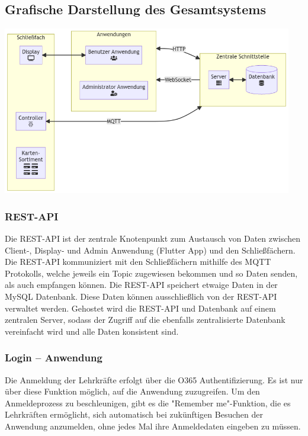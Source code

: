 \subsection{Grafische Darstellung des Gesamtsystems}
\begin{center}
\includegraphics[width=0.95\textwidth]{MJ/assets/complete-system.png}
\end{center}

\subsubsection{REST-API}
Die REST-API ist der zentrale Knotenpunkt zum Austausch von Daten zwischen Client-, Display- und Admin Anwendung (Flutter App) und den Schließfächern. Die REST-API kommuniziert mit den Schließfächern mithilfe des MQTT Protokolls, welche jeweils ein Topic zugewiesen bekommen und so Daten senden, als auch empfangen können. Die REST-API speichert etwaige Daten in der MySQL Datenbank. Diese Daten können ausschließlich von der REST-API verwaltet werden. Gehostet wird die REST-API und Datenbank auf einem zentralen Server, sodass der Zugriff auf die ebenfalls zentralisierte Datenbank vereinfacht wird und alle Daten konsistent sind.

\subsubsection{Login – Anwendung}
Die Anmeldung der Lehrkräfte erfolgt über die O365 Authentifizierung. Es ist nur über diese Funktion möglich, auf die Anwendung zuzugreifen. Um den Anmeldeprozess zu beschleunigen, gibt es die "Remember me"-Funktion, die es Lehrkräften ermöglicht, sich automatisch bei zukünftigen Besuchen der Anwendung anzumelden, ohne jedes Mal ihre Anmeldedaten eingeben zu müssen.

